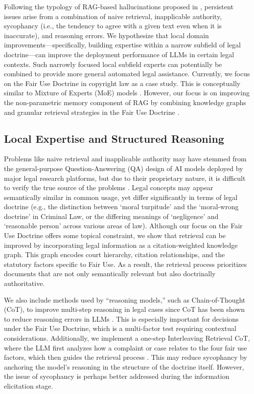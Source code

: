 Following the typology of RAG-based hallucinations proposed in \cite{04b_HallucinationFree}, persistent issues arise from a combination of naive retrieval, inapplicable authority, sycophancy (i.e., the tendency to agree with a given text even when it is inaccurate), and reasoning errors. We hypothesize that local domain improvements—specifically, building expertise within a narrow subfield of legal doctrine—can improve the deployment performance of LLMs in certain legal contexts. Such narrowly focused local subfield experts can potentially be combined to provide more general automated legal assistance. Currently, we focus on the Fair Use Doctrine in copyright law as a case study.  This is conceptually similar to Mixture of Experts (MoE) models \cite{13_AdaptiveMoE}. However, our focus is on improving the non-parametric memory component of RAG by combining knowledge graphs and granular retrieval strategies in the Fair Use Doctrine \cite{23_NonParametricRAGContinualLearning, 01_UnifyingKGwithLLM, 03b_SemanticRepresentationContextual, 02_DenseRetrieval}.

\subsection{Local Expertise and Structured Reasoning}

Problems like naive retrieval and inapplicable authority may have stemmed from the general-purpose Question-Answering (QA) design of AI models deployed by major legal research platforms, but due to their proprietary nature, it is difficult to verify the true source of the problems \cite{04b_HallucinationFree}. Legal concepts may appear semantically similar in common usage, yet differ significantly in terms of legal doctrine (e.g., the distinction between `moral turpitude' and the `moral-wrong doctrine' in Criminal Law, or the differing meanings of `negligence' and `reasonable person' across various areas of law). Although our focus on the Fair Use Doctrine offers some topical constraint, we show that retrieval can be improved by incorporating legal information as a citation-weighted knowledge graph. This graph encodes court hierarchy, citation relationships, and the statutory factors specific to Fair Use. As a result, the retrieval process prioritizes documents that are not only semantically relevant but also doctrinally authoritative.

We also include methods used by ``reasoning models,'' such as Chain-of-Thought (CoT), to improve multi-step reasoning in legal cases since CoT has been shown to reduce reasoning errors in LLMs \cite{08_CoT}. This is especially important for decisions under the Fair Use Doctrine, which is a multi-factor test requiring contextual considerations. Additionally, we implement a one-step Interleaving Retrieval CoT, where the LLM first analyzes how a complaint or case relates to the four fair use factors, which then guides the retrieval process \cite{28_CoTandIRCoT}. This may reduce sycophancy by anchoring the model’s reasoning in the structure of the doctrine itself. However, the issue of sycophancy is perhaps better addressed during the information elicitation stage.

